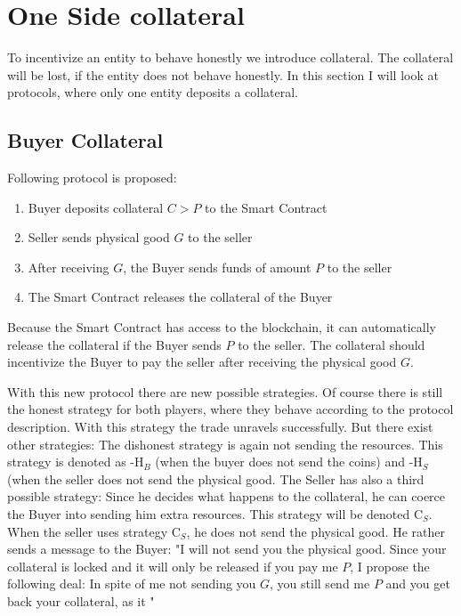 \documentclass{cacthesis}
\begin{document}
\section{One Side collateral}
To incentivize an entity to behave honestly we introduce collateral. The collateral will be lost, if the entity does not behave honestly. In this section I will look at protocols, where only one entity deposits a collateral.

\subsection{Buyer Collateral}
Following protocol is proposed:
\begin{enumerate}
    \item Buyer deposits collateral $C > P$ to the Smart Contract
    \item Seller sends physical good $G$ to the seller 
    \item After receiving $G$, the Buyer sends funds of amount $P$ to the seller 
    \item The Smart Contract releases the collateral of the Buyer
\end{enumerate}

Because the Smart Contract has access to the blockchain, it can automatically release the collateral if the Buyer sends $P$  to the seller. The collateral should incentivize the Buyer to pay the seller after receiving the physical good $G$.

With this new protocol there are new possible strategies. Of course there is still the honest strategy for both players, where they behave according to the protocol description. With this strategy the trade unravels successfully.\newline
But there exist other strategies: The dishonest strategy is again not sending the resources. This strategy is denoted as -H$_B$ (when the buyer does not send the coins) and -H$_S$ (when the seller does not send the physical good.\newline
The Seller has also a third possible strategy: Since he decides what happens to the collateral, he can coerce the Buyer into sending him extra resources. This strategy will be denoted C$_S$.  When the seller uses strategy C$_S$, he does not send the physical good. He rather sends a message to the Buyer: "I will not send you the physical good. Since your collateral is locked and it will only be released if you pay me $P$, I propose the following deal: In spite of me not sending you $G$, you still send me $P$ and you get back your collateral, as it "\newline
\end{document}
